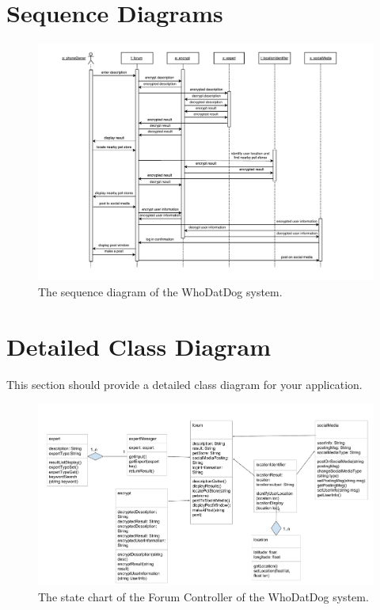 \documentclass[]{article}
\begin{document}
\section{Sequence Diagrams}
\label{sec:sequence_diagrams}
\begin{figure}[H]
	\centering
	\includegraphics[width=\textwidth]{sequencediagram.pdf}
	\caption{\label{fig:analysisclassdiagram}The sequence diagram of the WhoDatDog system.}
\end{figure}

\section{Detailed Class Diagram}
\label{sec:detailed_class_diagram}
This section should provide a detailed class diagram for your application.
\begin{figure}[H]
 \centering
 \includegraphics[width=\textwidth]{SE 3A04 D3 detailed class diagram.pdf}
 \caption{\label{fig:detailedclassdiagram}The state chart of the Forum Controller of the WhoDatDog system.}
\end{figure}
\end{document}
